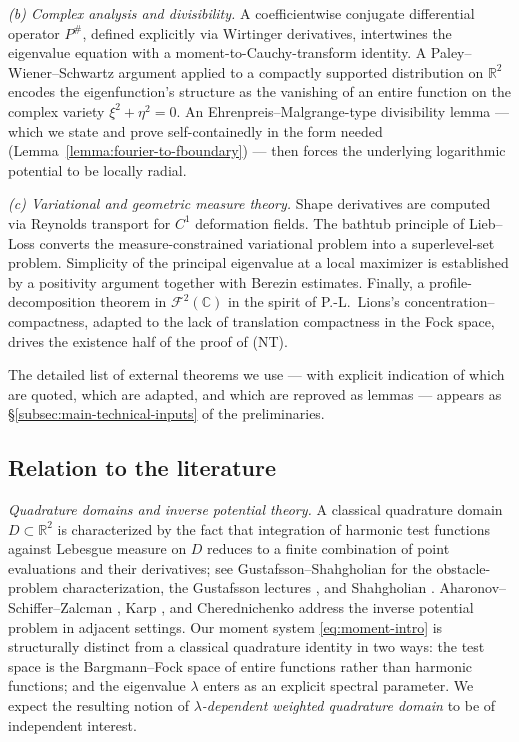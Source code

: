 \documentclass[a4paper,11pt,reqno]{amsart}
\numberwithin{equation}{section}
\theoremstyle{plain} %
\theoremstyle{definition} %
\theoremstyle{remark}
\newcommand{\R}{\mathbb{R}}
\newcommand{\C}{\mathbb{C}}
\begin{document}
\smallskip
\noindent\emph{(b) Complex analysis and divisibility.}
A coefficientwise conjugate differential operator $P^\#$, defined explicitly via Wirtinger derivatives, intertwines the eigenvalue equation with a moment-to-Cauchy-transform identity. A Paley--Wiener--Schwartz argument applied to a compactly supported distribution on $\R^2$ encodes the eigenfunction's structure as the vanishing of an entire function on the complex variety $\xi^2+\eta^2=0$. An Ehrenpreis--Malgrange-type divisibility lemma --- which we state and prove self-containedly in the form needed (Lemma~\ref{lemma:fourier-to-fboundary}) --- then forces the underlying logarithmic potential to be locally radial.

\smallskip
\noindent\emph{(c) Variational and geometric measure theory.}
Shape derivatives are computed via Reynolds transport for $C^1$ deformation fields. The bathtub principle of Lieb--Loss \cite{Lieb} converts the measure-constrained variational problem into a superlevel-set problem. Simplicity of the principal eigenvalue at a local maximizer is established by a positivity argument together with Berezin estimates. Finally, a profile-decomposition theorem in $\mathcal F^2(\C)$ in the spirit of P.-L.~Lions's concentration--compactness, adapted to the lack of translation compactness in the Fock space, drives the existence half of the proof of (NT).

The detailed list of external theorems we use --- with explicit indication of which are quoted, which are adapted, and which are reproved as lemmas --- appears as \S\ref{subsec:main-technical-inputs} of the preliminaries.

\subsection{Relation to the literature}\label{ssec:intro-related}

\noindent\emph{Quadrature domains and inverse potential theory.}
A classical quadrature domain $D\subset\R^2$ is characterized by the fact that integration of harmonic test functions against Lebesgue measure on $D$ reduces to a finite combination of point evaluations and their derivatives; see Gustafsson--Shahgholian \cite{Gustafsson-Shahgholian} for the obstacle-problem characterization, the Gustafsson lectures \cite{Gustafsson}, and Shahgholian \cite{Shahgholian}. Aharonov--Schiffer--Zalcman \cite{Aharonov-Schiffer-Zalcman}, Karp \cite{Karp}, and Cherednichenko \cite{Cherednichenko} address the inverse potential problem in adjacent settings. Our moment system \eqref{eq:moment-intro} is structurally distinct from a classical quadrature identity in two ways: the test space is the Bargmann--Fock space of entire functions rather than harmonic functions; and the eigenvalue $\lambda$ enters as an explicit spectral parameter. We expect the resulting notion of \emph{$\lambda$-dependent weighted quadrature domain} to be of independent interest.
\end{document}
